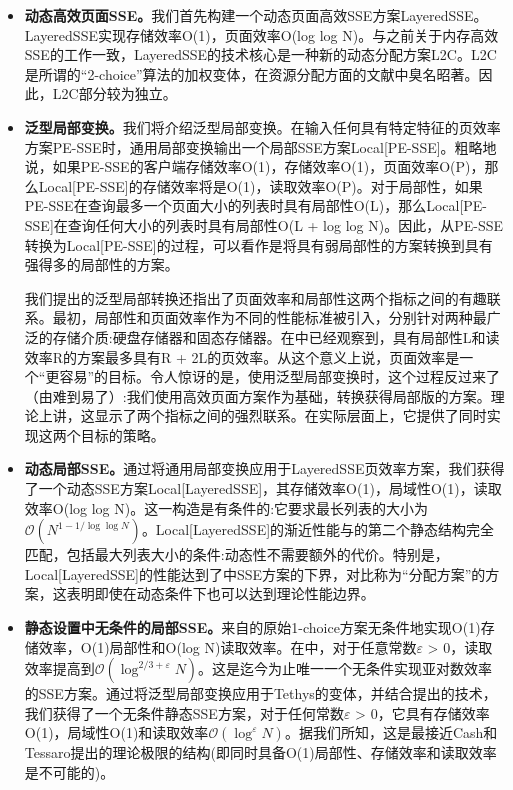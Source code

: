 \documentclass[UTF8]{article}
\begin{document}
\begin{itemize}
  \item \textbf{动态高效页面SSE。}我们首先构建一个动态页面高效SSE方案LayeredSSE。LayeredSSE实现存储效率O(1)，页面效率O(log log N)。与之前关于内存高效SSE的工作一致，LayeredSSE的技术核心是一种新的动态分配方案L2C。L2C是所谓的“2-choice”算法的加权变体，在资源分配方面的文献中臭名昭著。因此，L2C部分较为独立。
  \item \textbf{泛型局部变换。}我们将介绍泛型局部变换。在输入任何具有特定特征的页效率方案PE-SSE时，通用局部变换输出一个局部SSE方案Local[PE-SSE]。粗略地说，如果PE-SSE的客户端存储效率O(1)，存储效率O(1)，页面效率O(P)，那么Local[PE-SSE]的存储效率将是O(1)，读取效率O(P)。对于局部性，如果PE-SSE在查询最多一个页面大小的列表时具有局部性O(L)，那么Local[PE-SSE]在查询任何大小的列表时具有局部性O(L + log log N)。因此，从PE-SSE转换为Local[PE-SSE]的过程，可以看作是将具有弱局部性的方案转换到具有强得多的局部性的方案。
  
  我们提出的泛型局部转换还指出了页面效率和局部性这两个指标之间的有趣联系。最初，局部性和页面效率作为不同的性能标准被引入，分别针对两种最广泛的存储介质:硬盘存储器和固态存储器。在\cite{AngleBossuat2021SSEAS}中已经观察到，具有局部性L和读效率R的方案最多具有R + 2L的页效率。从这个意义上说，页面效率是一个“更容易”的目标。令人惊讶的是，使用泛型局部变换时，这个过程反过来了（由难到易了）:我们使用高效页面方案作为基础，转换获得局部版的方案。理论上讲，这显示了两个指标之间的强烈联系。在实际层面上，它提供了同时实现这两个目标的策略。
  \item \textbf{动态局部SSE。}通过将通用局部变换应用于LayeredSSE页效率方案，我们获得了一个动态SSE方案Local[LayeredSSE]，其存储效率O(1)，局域性O(1)，读取效率O(log log N)。这一构造是有条件的:它要求最长列表的大小为$\mathcal{O}\left(N^{1-1 / \log \log N}\right)$。Local[LayeredSSE]的渐近性能与\cite{GiladAsharov2021SearchableSE}的第二个静态结构完全匹配，包括最大列表大小的条件:动态性不需要额外的代价。特别是，Local[LayeredSSE]的性能达到了\cite{GiladAsharov2021TightTI}中SSE方案的下界，对比\cite{GiladAsharov2021TightTI}称为“分配方案”的方案，这表明即使在动态条件下也可以达到理论性能边界。
  \item \textbf{静态设置中无条件的局部SSE。}来自\cite{GiladAsharov2021SearchableSE}的原始1-choice方案无条件地实现O(1)存储效率，O(1)局部性和O(log N)读取效率。在\cite{IoannisDemertzis2018SearchableEW}中，对于任意常数$\varepsilon$ > 0，读取效率提高到$\mathcal{O}\left(\log ^{2 / 3+\varepsilon} N\right)$。这是迄今为止唯一一个无条件实现亚对数效率的SSE方案。通过将泛型局部变换应用于Tethys的变体\cite{AngleBossuat2021SSEAS}，并结合\cite{IoannisDemertzis2018SearchableEW}提出的技术，我们获得了一个无条件静态SSE方案，对于任何常数$\varepsilon$ > 0，它具有存储效率O(1)，局域性O(1)和读取效率$\mathcal{O}\left(\log ^{\varepsilon} N\right)$。据我们所知，这是最接近Cash和Tessaro提出的理论极限的结构(即同时具备O(1)局部性、存储效率和读取效率是不可能的)。
\end{itemize}
\end{document}
